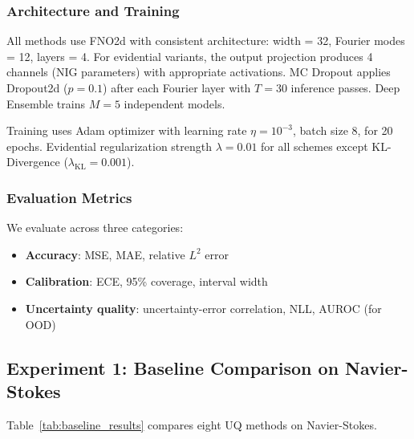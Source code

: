 \subsubsection{Architecture and Training}

All methods use FNO2d with consistent architecture: width = 32, Fourier modes = 12, layers = 4. For evidential variants, the output projection produces 4 channels (NIG parameters) with appropriate activations. MC Dropout applies Dropout2d ($p = 0.1$) after each Fourier layer with $T = 30$ inference passes. Deep Ensemble trains $M = 5$ independent models.

Training uses Adam optimizer with learning rate $\eta = 10^{-3}$, batch size 8, for 20 epochs. Evidential regularization strength $\lambda = 0.01$ for all schemes except KL-Divergence ($\lambda_{\text{KL}} = 0.001$).

\subsubsection{Evaluation Metrics}

We evaluate across three categories:
\begin{itemize}
    \item \textbf{Accuracy}: MSE, MAE, relative $L^2$ error
    \item \textbf{Calibration}: ECE, 95\% coverage, interval width
    \item \textbf{Uncertainty quality}: uncertainty-error correlation, NLL, AUROC (for OOD)
\end{itemize}

\subsection{Experiment 1: Baseline Comparison on Navier-Stokes}

Table~\ref{tab:baseline_results} compares eight UQ methods on Navier-Stokes.

